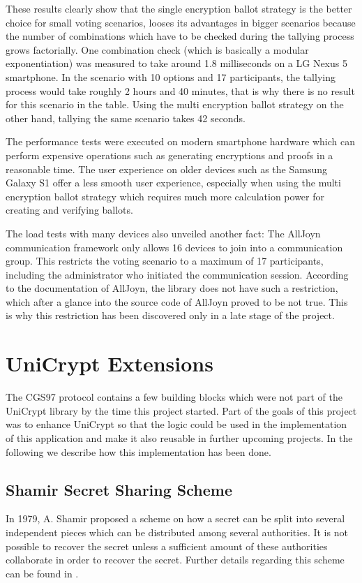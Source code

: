 \documentclass[numbers=noenddot, abstract=on, a4paper, headsepline,
footsepline, oneside, openright, draft=off, listof=leveldown]{scrreprt}
\begin{document}
These results clearly show that the single encryption ballot strategy is the
better choice for small voting scenarios, looses its advantages in bigger
scenarios because the number of combinations which have to be checked during the
tallying process grows factorially. One combination check (which is
basically a modular exponentiation) was measured to take around
1.8 milliseconds on a LG Nexus 5 smartphone. In the scenario with 10 options and
17 participants, the tallying process would take roughly 2 hours and 40 minutes,
that is why there is no result for this scenario in the table. Using the multi
encryption ballot strategy on the other hand, tallying the same scenario takes 42 seconds. 

The performance tests were executed on modern smartphone hardware which can
perform expensive operations such as generating encryptions and proofs in a
reasonable time. The user experience on older devices such as the Samsung Galaxy
S1 offer a less smooth user experience, especially when using the multi
encryption ballot strategy which requires much more calculation power for
creating and verifying ballots.

The load tests with many devices also unveiled another fact: The AllJoyn
communication framework only allows 16 devices to join into a communication
group. This restricts the voting scenario to a maximum of 17 participants,
including the administrator who initiated the communication session. According
to the documentation of AllJoyn, the library does not have such a restriction,
which after a glance into the source code of AllJoyn proved to be not true. This
is why this restriction has been discovered only in a late stage of the project.

\section{UniCrypt Extensions}
\label{sec:enhancmentsunicrypt}
The CGS97 protocol contains a few building blocks which were not part of the
UniCrypt library by the time this project started. Part of the goals of this
project was to enhance UniCrypt so that the logic could be used in the
implementation of this application and make it also reusable in further upcoming
projects. In the following we describe how this implementation has been done.

\subsection{Shamir Secret Sharing Scheme}
In 1979, A. Shamir proposed a scheme \cite{Shamir79} on how a secret can be
split into several independent pieces which can be distributed among several
authorities. It is not possible to recover the secret unless a sufficient amount
of these authorities collaborate in order to recover the secret. Further details
regarding this scheme can be found in .
\end{document}
